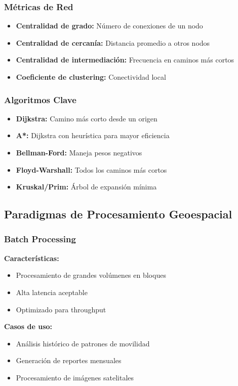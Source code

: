 \documentclass[11pt,a4paper]{article}
\begin{document}
\subsubsection{Métricas de Red}
\begin{itemize}
    \item \textbf{Centralidad de grado:} Número de conexiones de un nodo
    \item \textbf{Centralidad de cercanía:} Distancia promedio a otros nodos
    \item \textbf{Centralidad de intermediación:} Frecuencia en caminos más cortos
    \item \textbf{Coeficiente de clustering:} Conectividad local
\end{itemize}

\subsubsection{Algoritmos Clave}
\begin{itemize}
    \item \textbf{Dijkstra:} Camino más corto desde un origen
    \item \textbf{A*:} Dijkstra con heurística para mayor eficiencia
    \item \textbf{Bellman-Ford:} Maneja pesos negativos
    \item \textbf{Floyd-Warshall:} Todos los caminos más cortos
    \item \textbf{Kruskal/Prim:} Árbol de expansión mínima
\end{itemize}

\subsection{Paradigmas de Procesamiento Geoespacial}

\subsubsection{Batch Processing}
\textbf{Características:}
\begin{itemize}
    \item Procesamiento de grandes volúmenes en bloques
    \item Alta latencia aceptable
    \item Optimizado para throughput
\end{itemize}

\textbf{Casos de uso:}
\begin{itemize}
    \item Análisis histórico de patrones de movilidad
    \item Generación de reportes mensuales
    \item Procesamiento de imágenes satelitales
\end{itemize}
\end{document}
